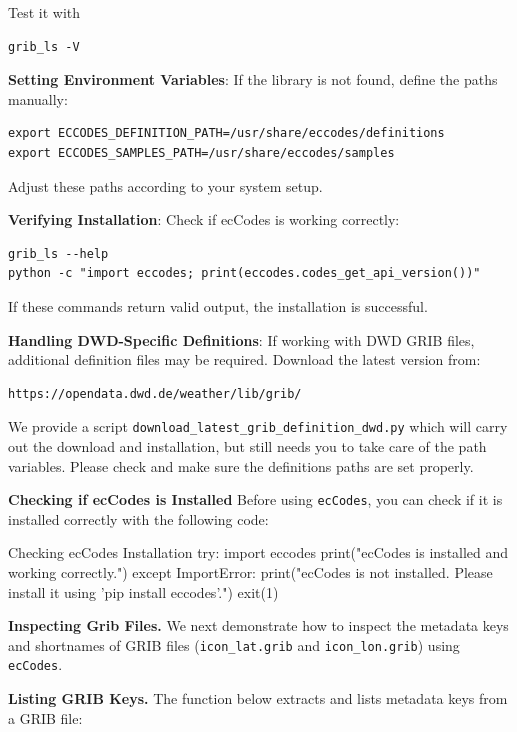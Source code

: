 Test it with 
\begin{lstlisting}
grib_ls -V
\end{lstlisting}

{\bf Setting Environment Variables}: If the library is not found, define the paths manually:
\begin{lstlisting}
export ECCODES_DEFINITION_PATH=/usr/share/eccodes/definitions
export ECCODES_SAMPLES_PATH=/usr/share/eccodes/samples
\end{lstlisting}
Adjust these paths according to your system setup.

{\bf Verifying Installation}: Check if ecCodes is working correctly:
\begin{lstlisting}
grib_ls --help
python -c "import eccodes; print(eccodes.codes_get_api_version())"\end{lstlisting}
If these commands return valid output, the installation is successful.

{\bf Handling DWD-Specific Definitions}: If working with DWD GRIB files, additional definition files may be required. Download the latest version from:
\begin{lstlisting}
https://opendata.dwd.de/weather/lib/grib/
\end{lstlisting}
We provide a script \texttt{download\_latest\_grib\_definition\_dwd.py} which will carry out the download and installation, but still needs you to take care of the path variables. 
Please check and make sure the definitions paths are set properly. 


{\bf Checking if ecCodes is Installed}
Before using \texttt{ecCodes}, you can check if it is installed correctly with the following code:

\begin{codeonly}{Checking ecCodes Installation}
try:
    import eccodes
    print("ecCodes is installed and working correctly.")
except ImportError:
    print("ecCodes is not installed. Please install it using 'pip install eccodes'.")
    exit(1)
\end{codeonly}


{\bf Inspecting Grib Files.}
We next demonstrate how to inspect the metadata keys and shortnames of GRIB files (\texttt{icon\_lat.grib} and \texttt{icon\_lon.grib}) using \texttt{ecCodes}.

{\bf Listing GRIB Keys.} The function below extracts and lists metadata keys from a GRIB file:

